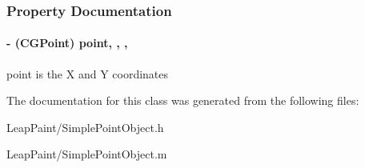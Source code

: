 \subsubsection{Property Documentation}
\hypertarget{interface_simple_point_object_a9796a8e6a00e61bb255f59a80aef77d4}{
\paragraph[{point}]{\setlength{\rightskip}{0pt plus 5cm}-\/ (C\-G\-Point) point\hspace{0.3cm}{\ttfamily [read]}, {\ttfamily [write]}, {\ttfamily [nonatomic]}, {\ttfamily [assign]}}}\label{d8/d8e/interface_simple_point_object_a9796a8e6a00e61bb255f59a80aef77d4}
point is the X and Y coordinates 

The documentation for this class was generated from the following files\-:\begin{DoxyCompactItemize}
\item 
Leap\-Paint/Simple\-Point\-Object.\-h\item 
Leap\-Paint/Simple\-Point\-Object.\-m\end{DoxyCompactItemize}
